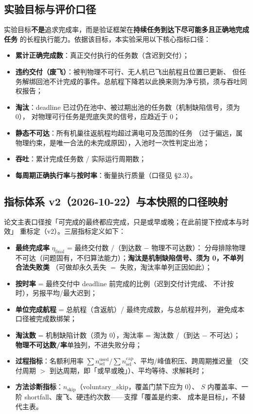 \documentclass[a4paper,11pt]{article}
\begin{document}
\subsection{实验目标与评价口径}

实验目标\textbf{不是}追求完成率，而是验证框架在\textbf{持续任务到达下尽可能多且正确地完成任务}
的长程执行能力。依据该目标，本实验采用以下核心指标口径：

\begin{itemize}
  \item \textbf{累计正确完成数}：真正交付执行的任务数（含迟到交付）；
  \item \textbf{违约交付（废飞）}：被判物理不可行、无人机已飞出航程且位置已更新、
        但任务解绑回池不计完成的事件。总航程下降若以此换来则为净亏损，须与吞吐同权报告；
  \item \textbf{淘汰}：deadline 已过仍在池中、被过期出池的任务数（机制缺陷信号，须为 0），
        对物理可行任务是兜底失灵的信号，应趋近于 0；
  \item \textbf{静态不可达}：所有机巢往返航程均超过满电可及范围的任务
        （过于偏远，属物理约束，是唯一合法的未完成原因），入池时一次性判定出池；
  \item \textbf{吞吐}：累计完成任务数 / 实际运行周期数；
  \item \textbf{每周期正确执行率}与\textbf{按时率}：衡量执行质量（口径见 \S 2.3）。
\end{itemize}

\subsection{指标体系 v2（2026-10-22）与本快照的口径映射}

论文主表口径按「可完成的最终都应完成，只是或早或晚；在此前提下控成本与时效」
重标定（v2）。三层指标定义如下：

\begin{itemize}
  \item \textbf{最终完成率} $\eta_{\mathrm{final}}$ = 最终交付数 /（到达数 $-$ 物理不可达数）：
        分母排除物理不可达（问题固有，不归算法能力）；\textbf{淘汰是机制缺陷信号、须为 0，不单列合法失败类}
        （可做却永久丢失 $=$ 失败，淘汰率单列正因如此）；
  \item \textbf{按时率} = 最终交付中 deadline 前完成的比例（迟到交付计完成、
        不计按时），另报平均/最大迟到；
  \item \textbf{单位完成航程} = 总航程（含返航）/ 最终完成数，与总航程并列，
        避免成本口径被完成数绑架；
  \item \textbf{淘汰数} = 机制缺陷计数（须为 0），淘汰率 = 淘汰数 /（到达 $-$ 不可达）；
        \textbf{物理不可达数/率}单独列，不进失败分母；
  \item \textbf{过程指标}：名额利用率 $\sum n_{\mathrm{sel}}^{\mathrm{used}} /
        \sum n_{\mathrm{sel}}^{\mathrm{cap}}$、平均/峰值积压、跨周期推迟量
        （交付周期 $>$ 到达周期，即「或早或晚」）、平均等待、求解耗时；
  \item \textbf{方法诊断指标}：$n_{\mathrm{skip}}$（voluntary\_skip，覆盖门禁下应为 0）、
        $S$ 内覆盖率、一阶 shortfall、废飞、硬违约次数——支撑「覆盖是约束、
        成本是目标」，不替代主表。
\end{itemize}
\end{document}
